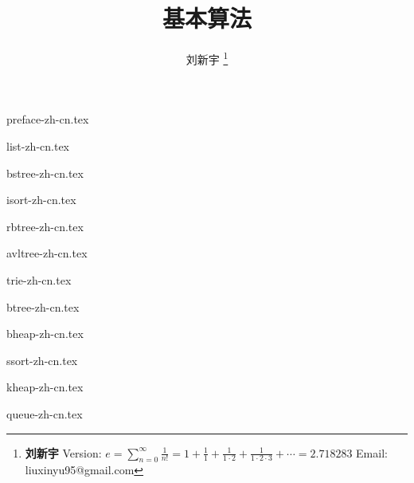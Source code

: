 \documentclass[zihao=5, b5paper, twoside, heading=true, punct=kaiming]{ctexbook}
\begin{document}


\title{
  {\bf \Huge 基本算法}
  \centering
}

\author{刘新宇
  \thanks{{\bfseries 刘新宇} \newline
    Version: $\displaystyle e = \sum \limits _{n=0}^{\infty }{\frac {1}{n!}} = 1 + {\frac {1}{1}}+{\frac {1}{1\cdot 2}}+{\frac {1}{1\cdot 2\cdot 3}}+\cdots = 2.718283$ \newline
    Email: liuxinyu95@gmail.com \newline
    }}

\maketitle

\frontmatter
{preface-zh-cn.tex}

\tableofcontents
\newpage

\mainmatter

{list-zh-cn.tex}

{bstree-zh-cn.tex}

{isort-zh-cn.tex}

{rbtree-zh-cn.tex}

{avltree-zh-cn.tex}

{trie-zh-cn.tex}

{btree-zh-cn.tex}

{bheap-zh-cn.tex}

{ssort-zh-cn.tex}

{kheap-zh-cn.tex}

{queue-zh-cn.tex}
\end{document}
